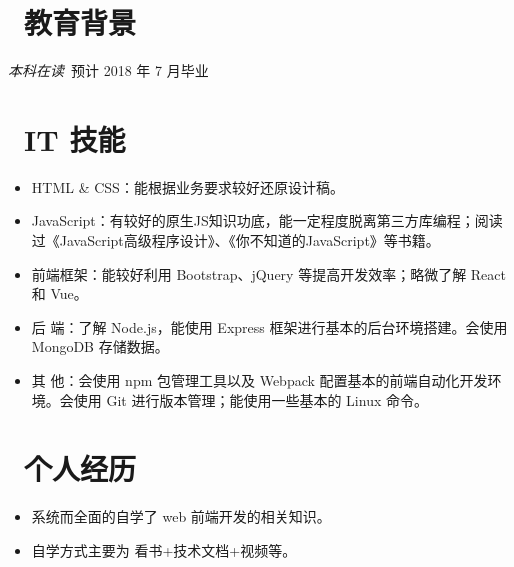 \documentclass{resume}
\begin{document}


  

 
\section{\faGraduationCap\  教育背景}
\textit{本科在读}\ 预计 2018 年 7 月毕业


\section{\faCog\ IT 技能}
\begin{itemize}[parsep=0.5ex]
  \item HTML \& CSS：能根据业务要求较好还原设计稿。
  \item JavaScript：有较好的原生JS知识功底，能一定程度脱离第三方库编程；阅读过《JavaScript高级程序设计》、《你不知道的JavaScript》等书籍。
  \item 前端框架：能较好利用 Bootstrap、jQuery 等提高开发效率；略微了解 React和 Vue。
  \item 后    端：了解 Node.js，能使用 Express 框架进行基本的后台环境搭建。会使用 MongoDB 存储数据。
  \item 其    他：会使用 npm 包管理工具以及 Webpack 配置基本的前端自动化开发环境。会使用 Git 进行版本管理；能使用一些基本的 Linux 命令。
\end{itemize}


\section{\faUser\ 个人经历}
\begin{itemize}
  \item 系统而全面的自学了 web 前端开发的相关知识。
  \item 自学方式主要为 看书+技术文档+视频等。
  
\end{itemize}
\end{document}
